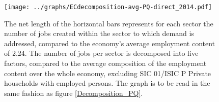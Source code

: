 \documentclass[12pt,english]{article}
\begin{document}
\begin{figure}[!ht]
	\centering
	\texttt{[image: ../graphs/ECdecomposition-avg-PQ-direct\_2014.pdf]}
	\caption{\label{Decomposition_PQ_within}\footnotesize The net length of the horizontal bars represents for each sector the number of jobs created within the sector to which demand is addressed, compared to the economy's average employment content of 2.24. The number of jobs per sector is decomposed into five factors, compared to the average composition of the employment content over the whole economy, excluding SIC 01/ISIC P Private households with employed persons. The graph is to be read in the same fashion as figure \ref{Decomposition_PQ}. %
	}
\end{figure}	
\end{document}
